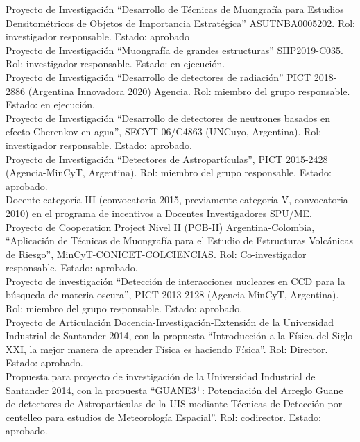  Proyecto de Investigación ``Desarrollo de Técnicas de Muongrafía para Estudios Densitométricos de Objetos de Importancia Estratégica'' ASUTNBA0005202. Rol: investigador responsable. Estado: aprobado\\
 Proyecto de Investigación ``Muongrafía de grandes estructuras'' SIIP2019-C035. Rol: investigador responsable. Estado: en ejecución.\\
 Proyecto de Investigación ``Desarrollo de detectores de radiación'' PICT 2018-2886 (Argentina Innovadora 2020) Agencia. Rol: miembro del grupo responsable. Estado: en ejecución.\\
 Proyecto de Investigación ``Desarrollo de detectores de neutrones basados en efecto Cherenkov en agua'', SECYT 06/C4863 (UNCuyo, Argentina). Rol: investigador responsable. Estado: aprobado.\\
 Proyecto de Investigación ``Detectores de Astropartículas'', PICT 2015-2428 (Agencia-MinCyT, Argentina). Rol: miembro del grupo responsable. Estado: aprobado.\\
 Docente categoría III (convocatoria 2015, previamente categoría V, convocatoria 2010) en el programa de incentivos a Docentes Investigadores SPU/ME.\\
\ifres
\else
{} Proyecto de Cooperation Project Nivel II (PCB-II) Argentina-Colombia, ``Aplicación de Técnicas de Muongrafía para el Estudio de Estructuras Volcánicas de Riesgo'', MinCyT-CONICET-COLCIENCIAS. Rol: Co-investigador responsable. Estado: aprobado.\\
 Proyecto de investigación ``Detección de interacciones nucleares en CCD para la búsqueda de materia oscura'', PICT 2013-2128 (Agencia-MinCyT, Argentina). Rol: miembro del grupo responsable. Estado: aprobado.\\
 Proyecto de Articulación Docencia-Investigación-Extensión de la Universidad Industrial de Santander 2014, con la propuesta ``Introducción a la Física del Siglo XXI, la mejor manera de aprender Física es haciendo Física''. Rol: Director. Estado: aprobado.\\
 Propuesta para proyecto de investigación de la Universidad Industrial de Santander 2014, con la propuesta ``GUANE3$^+$: Potenciación del Arreglo Guane de detectores de Astropartículas de la UIS mediante Técnicas de Detección por centelleo para estudios de Meteorología Espacial''. Rol: codirector. Estado: aprobado.\\
